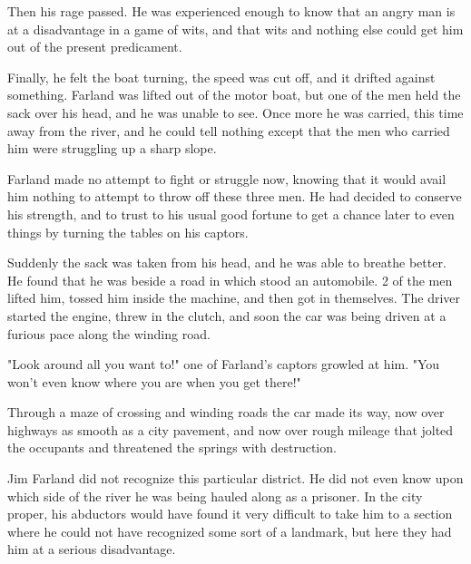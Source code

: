 \documentclass{novel}
\begin{document}
Then his rage passed. He was experienced enough to know that an angry man is at a disadvantage in a game of wits, and that wits and nothing else could get him out of the present predicament.

Finally, he felt the boat turning, the speed was cut off, and it drifted against something. Farland was lifted out of the motor boat, but one of the men held the sack over his head, and he was unable to see. Once more he was carried, this time away from the river, and he could tell nothing except that the men who carried him were struggling up a sharp slope.

Farland made no attempt to fight or struggle now, knowing that it would avail him nothing to attempt to throw off these three men. He had decided to conserve his strength, and to trust to his usual good fortune to get a chance later to even things by turning the tables on his captors.

Suddenly the sack was taken from his head, and he was able to breathe better. He found that he was beside a road in which stood an automobile. 2 of the men lifted him, tossed him inside the machine, and then got in themselves. The driver started the engine, threw in the clutch, and soon the car was being driven at a furious pace along the winding road.

"Look around all you want to!" one of Farland's captors growled at him. "You won't even know where you are when you get there!"

\vspace{2\nbs}
\clearpage
\thispagestyle{empty}

\begin{ChapterStart}
\vspace{3\nbs}
\end{ChapterStart}
    
Through a maze of crossing and winding roads the car made its way, now over highways as smooth as a city pavement, and now over rough mileage that jolted the occupants and threatened the springs with destruction.

Jim Farland did not recognize this particular district. He did not even know upon which side of the river he was being hauled along as a prisoner. In the city proper, his abductors would have found it very difficult to take him to a section where he could not have recognized some sort of a landmark, but here they had him at a serious disadvantage.
\end{document}
